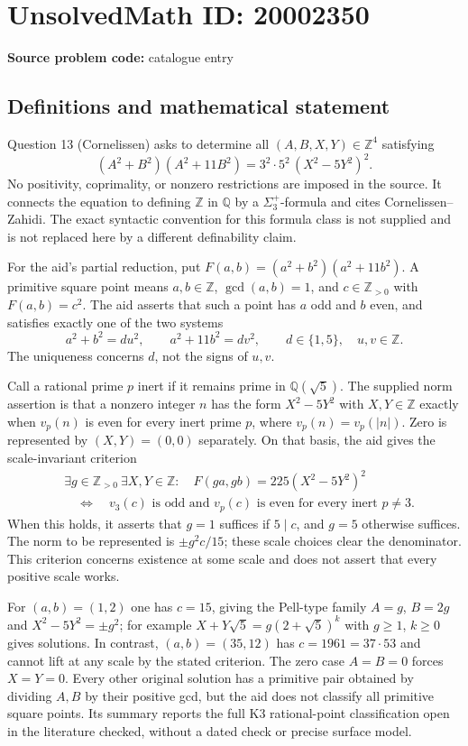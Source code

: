 \documentclass[11pt]{article}
\newcommand{\Z}{\mathbb{Z}}
\newcommand{\Q}{\mathbb{Q}}
\begin{document}
\section*{UnsolvedMath ID: 20002350}
\textbf{Source problem code:} catalogue entry
\subsection{Definitions and mathematical statement}
Question 13 (Cornelissen) asks to determine all $(A,B,X,Y)\in\Z^4$ satisfying
\[
(A^2+B^2)(A^2+11B^2)=3^2\cdot5^2\,(X^2-5Y^2)^2.
\]
No positivity, coprimality, or nonzero restrictions are imposed in the source. It connects the equation to defining $\Z$ in $\Q$ by a $\Sigma_3^+$-formula and cites Cornelissen--Zahidi. The exact syntactic convention for this formula class is not supplied and is not replaced here by a different definability claim.

For the aid's partial reduction, put $F(a,b)=(a^2+b^2)(a^2+11b^2)$. A primitive square point means $a,b\in\Z$, $\gcd(a,b)=1$, and $c\in\Z_{>0}$ with $F(a,b)=c^2$. The aid asserts that such a point has $a$ odd and $b$ even, and satisfies exactly one of the two systems
\[
a^2+b^2=d u^2,\qquad a^2+11b^2=d v^2,\qquad d\in\{1,5\},\quad u,v\in\Z.
\]
The uniqueness concerns $d$, not the signs of $u,v$.

Call a rational prime $p$ inert if it remains prime in $\Q(\sqrt5)$. The supplied norm assertion is that a nonzero integer $n$ has the form $X^2-5Y^2$ with $X,Y\in\Z$ exactly when $v_p(n)$ is even for every inert prime $p$, where $v_p(n)=v_p(|n|)$. Zero is represented by $(X,Y)=(0,0)$ separately. On that basis, the aid gives the scale-invariant criterion
\[
\begin{split}
&\exists g\in\Z_{>0}\ \exists X,Y\in\Z:\quad
F(ga,gb)=225(X^2-5Y^2)^2\\
&\quad\Longleftrightarrow\quad
v_3(c)\text{ is odd and }v_p(c)\text{ is even for every inert }p\ne3.
\end{split}
\]
When this holds, it asserts that $g=1$ suffices if $5\mid c$, and $g=5$ otherwise suffices. The norm to be represented is $\pm g^2c/15$; these scale choices clear the denominator. This criterion concerns existence at some scale and does not assert that every positive scale works.

For $(a,b)=(1,2)$ one has $c=15$, giving the Pell-type family $A=g$, $B=2g$ and $X^2-5Y^2=\pm g^2$; for example $X+Y\sqrt5=g(2+\sqrt5)^k$ with $g\geq1$, $k\geq0$ gives solutions. In contrast, $(a,b)=(35,12)$ has $c=1961=37\cdot53$ and cannot lift at any scale by the stated criterion. The zero case $A=B=0$ forces $X=Y=0$. Every other original solution has a primitive pair obtained by dividing $A,B$ by their positive gcd, but the aid does not classify all primitive square points. Its summary reports the full K3 rational-point classification open in the literature checked, without a dated check or precise surface model.
\end{document}
